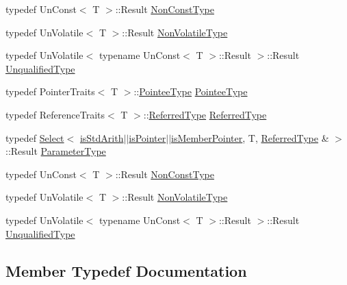 \begin{DoxyCompactItemize}
\item 
typedef Un\+Const$<$ T $>$\+::Result \mbox{\hyperlink{classUtil_1_1TypeTraits_a4fd9a7bd65b33d0ac3e035024ff0d8f0}{Non\+Const\+Type}}
\item 
typedef Un\+Volatile$<$ T $>$\+::Result \mbox{\hyperlink{classUtil_1_1TypeTraits_a8ffbb0166d5a321e021ac2171f2d4981}{Non\+Volatile\+Type}}
\item 
typedef Un\+Volatile$<$ typename Un\+Const$<$ T $>$\+::Result $>$\+::Result \mbox{\hyperlink{classUtil_1_1TypeTraits_a9d25b7cafbc7acafa3275b5fe5a04ee0}{Unqualified\+Type}}
\item 
typedef Pointer\+Traits$<$ T $>$\+::\mbox{\hyperlink{classUtil_1_1TypeTraits_aa964d0cd9ee331e0d2d814a33bb93614}{Pointee\+Type}} \mbox{\hyperlink{classUtil_1_1TypeTraits_aa964d0cd9ee331e0d2d814a33bb93614}{Pointee\+Type}}
\item 
typedef Reference\+Traits$<$ T $>$\+::\mbox{\hyperlink{classUtil_1_1TypeTraits_a89aec1a9db97b7f70e59b6738c5df4f9}{Referred\+Type}} \mbox{\hyperlink{classUtil_1_1TypeTraits_a89aec1a9db97b7f70e59b6738c5df4f9}{Referred\+Type}}
\item 
typedef \mbox{\hyperlink{structUtil_1_1Select}{Select}}$<$ \mbox{\hyperlink{classUtil_1_1TypeTraits_abfcd1f4b7a5011b6ea8b965d1b46e54ea3017f19abc6084d7e144891aaf5adb0f}{is\+Std\+Arith}}$\vert$$\vert$\mbox{\hyperlink{classUtil_1_1TypeTraits_ad589492a3d9a9a4fd5154de3efb032c1a0813f58ed7af0a00a07d0ba641cc3bba}{is\+Pointer}}$\vert$$\vert$\mbox{\hyperlink{classUtil_1_1TypeTraits_aee8735f108bb235c2d59b8b823e04086abe04caa758890fee25930d96123265d2}{is\+Member\+Pointer}}, T, \mbox{\hyperlink{classUtil_1_1TypeTraits_a89aec1a9db97b7f70e59b6738c5df4f9}{Referred\+Type}} \& $>$\+::Result \mbox{\hyperlink{classUtil_1_1TypeTraits_a36b64fb2fc53ff32a8465e8862632db6}{Parameter\+Type}}
\item 
typedef Un\+Const$<$ T $>$\+::Result \mbox{\hyperlink{classUtil_1_1TypeTraits_a4fd9a7bd65b33d0ac3e035024ff0d8f0}{Non\+Const\+Type}}
\item 
typedef Un\+Volatile$<$ T $>$\+::Result \mbox{\hyperlink{classUtil_1_1TypeTraits_a8ffbb0166d5a321e021ac2171f2d4981}{Non\+Volatile\+Type}}
\item 
typedef Un\+Volatile$<$ typename Un\+Const$<$ T $>$\+::Result $>$\+::Result \mbox{\hyperlink{classUtil_1_1TypeTraits_a9d25b7cafbc7acafa3275b5fe5a04ee0}{Unqualified\+Type}}
\end{DoxyCompactItemize}


\subsection{Member Typedef Documentation}
\mbox{\label{classUtil_1_1TypeTraits_a4fd9a7bd65b33d0ac3e035024ff0d8f0}} 
